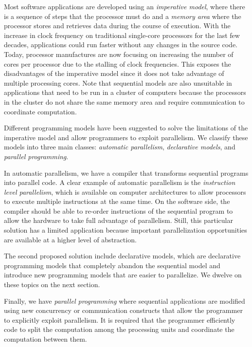 Most software applications are developed using an \emph{imperative model}, where
there is a sequence of steps that the processor must do and a \emph{memory area}
where the processor stores and retrieves data during the course of execution.
With the increase in clock frequency on traditional single-core processors for
the last few decades, applications could run faster without any changes in the
source code. Today, processor manufactures are now focusing on increasing the
number of cores per processor due to the stalling of clock frequencies. This
exposes the disadvantages of the imperative model since it does not take
advantage of multiple processing cores. Note that sequential models are also
unsuitable in applications that need to be run in a cluster of computers because
the processors in the cluster do not share the same memory area and require
communication to coordinate computation.

Different programming models have been suggested to solve the limitations of the
imperative model and allow programmers to exploit parallelism. We classify these
models into three main classes: \emph{automatic parallelism}, \emph{declarative models}, and
\emph{parallel programming}.

In automatic parallelism, we have a compiler that transforms sequential programs
into parallel code. A clear example of automatic parallelism is the
\emph{instruction level parallelism}, which is available on computer
architectures to allow processors to execute multiple instructions at the same
time. On the software side, the compiler should be able to re-order instructions
of the sequential program to allow the hardware to take full advantage of
parallelism. Still, this particular solution has a limited application because
important parallelization opportunities are available at a higher level of
abstraction.

The second proposed solution include declarative models, which are declarative
programming models that completely abandon the sequential model and introduce
new programming models that are easier to parallelize. We dwelve on these topics
on the next section.

Finally, we have \emph{parallel programming} where sequential applications are
modified using new concurrency or communication constructs that allow the
programmer to explicitly exploit parallelism. It is required that the programmer
efficiently code to split the computation among the processing units and
coordinate the computation between them.

